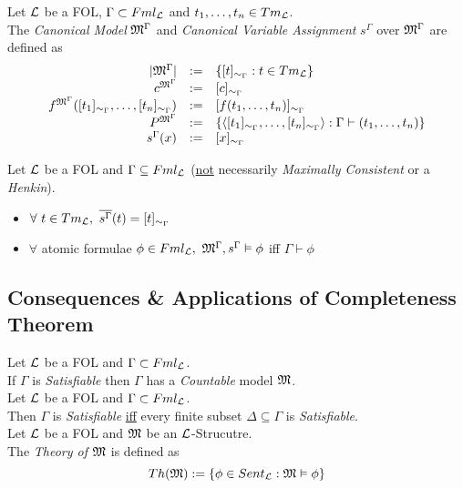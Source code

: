 \documentclass[11pt,a4paper]{article}
\begin{document}
Let $\mathcal{L}$ be a FOL, $\Gamma\subset Fml_{\mathcal{L}}$ and $t_1,\dots,t_n\in Tm_{\mathcal{L}}$.\\
The \textit{Canonical Model} $\mathfrak{M}^\Gamma$ and \textit{Canonical Variable Assignment} $s^\Gamma$ over $\mathfrak{M}^\Gamma$ are defined as
\[\begin{array}{rcl}
	|\mathfrak{M}^\Gamma|&:=&\{[t]_{\sim_\Gamma}:t\in Tm_{\mathcal{L}}\}\\
	c^{\mathfrak{M}^\Gamma}&:=&[c]_{\sim_\Gamma}\\
	f^{\mathfrak{M}^\Gamma}([t_1]_{\sim_\Gamma},\dots,[t_n]_{\sim_\Gamma})&:=&[f(t_1,\dots,t_n)]_{\sim_\Gamma}\\
	P^{\mathfrak{M}^\Gamma}&:=&\{\langle[t_1]_{\sim_\Gamma},\dots,[t_n]_{\sim_\Gamma}\rangle:\Gamma\vdash(t_1,\dots,t_n)\}\\
	s^\Gamma(x)&:=&[x]_{\sim_\Gamma}
\end{array}\]


Let $\mathcal{L}$ be a FOL and $\Gamma\subseteq Fml_{\mathcal{L}}$ (\underline{not} necessarily \textit{Maximally Consistent} or a \textit{Henkin}).
\begin{itemize}
	\item $\forall\ t\in Tm_\LL,\ \overline{s^\Gamma}(t)=[t]_{\sim_\Gamma}$
	\item $\forall$ atomic formulae $\phi\in Fml_\LL,\ \M^\Gamma,s^\Gamma\vDash\phi$ iff $\Gamma\vdash\phi$
\end{itemize}

\subsection{Consequences \& Applications of Completeness Theorem}

Let $\mathcal{L}$ be a FOL and $\Gamma\subset Fml_{\mathcal{L}}$.\\
If $\Gamma$ is \textit{Satisfiable} then $\Gamma$ has a \textit{Countable} model $\mathfrak{M}$.\\

Let $\mathcal{L}$ be a FOL and $\Gamma\subset Fml_{\mathcal{L}}$.\\
Then $\Gamma$ is \textit{Satisfiable} \underline{iff} every finite subset $\Delta\subseteq\Gamma$ is \textit{Satisfiable}.\\

Let $\mathcal{L}$ be a FOL and $\mathfrak{M}$ be an $\mathcal{L}$-Strucutre.\\
The \textit{Theory of $\mathfrak{M}$} is defined as
\[Th(\mathfrak{M}):=\{\phi\in Sent_{\mathcal{L}}:\mathfrak{M}\vDash\phi\}\]
\end{document}
